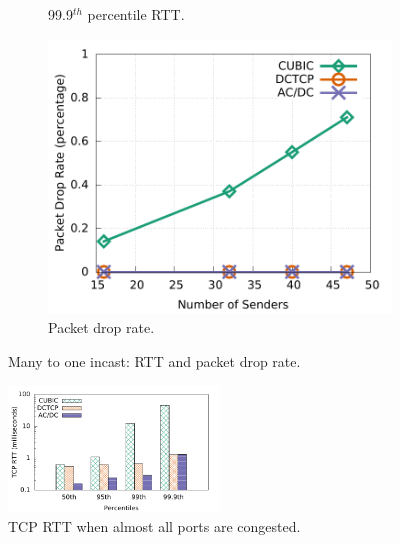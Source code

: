 \begin{figure}[!t]
\begin{subfigure}[b]{0.3\textwidth}
                \caption{99.9$^{th}$ percentile RTT.}
                \label{incast_9k_999th_sockperf}
        \end{subfigure}
        \begin{subfigure}[b]{0.3\textwidth}
                \centering
                \includegraphics[width=\textwidth]{acdctcp/figures/incast/plots9k/incast_droprate_vary_sender.pdf}
                \caption{Packet drop rate.}
                \label{incast_9k_droprate}
        \end{subfigure}
        \caption{Many to one incast: RTT and packet drop rate.}
        \label{incast_9k_sockperf_droprate}
\end{figure}


\begin{figure}[!t]
        \centering
  \includegraphics[width=0.5\textwidth]{acdctcp/figures/incast/pressure/incast_pressure_compare_sockperf.pdf}
        \caption{TCP RTT when almost all ports are congested.}
        \label{sockperf_pressure_incast}
\end{figure}

